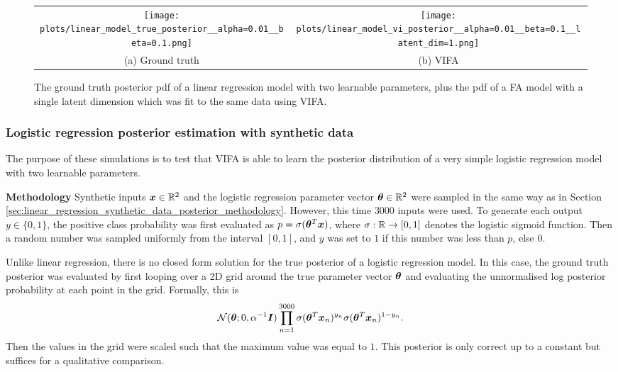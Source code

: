 \documentclass[10pt]{article} %
\begin{document}
\begin{figure}[!htbp] 
\begin{center}
\begin{tabular}{cc}
	\texttt{[image: plots/linear\_model\_true\_posterior\_\_alpha=0.01\_\_beta=0.1.png]}
	& \texttt{[image: plots/linear\_model\_vi\_posterior\_\_alpha=0.01\_\_beta=0.1\_\_latent\_dim=1.png]} \\
	(a) Ground truth
	& (b) VIFA \\[6pt]
\end{tabular}
\end{center}
\caption{The ground truth posterior pdf of a linear regression model with two learnable parameters, plus the pdf of a FA model with a single latent dimension which was fit to the same data using VIFA.}
\label{fig:linear_regression_synthetic_data_posterior}
\end{figure}


\subsubsection{Logistic regression posterior estimation with synthetic data}

The purpose of these simulations is to test that VIFA is able to learn the posterior distribution of a very simple logistic regression model with two learnable parameters.

\textbf{Methodology} Synthetic inputs ${\bm{x}} \in \mathbb{R}^2$ and the logistic regression parameter vector ${\bm{\theta}} \in \mathbb{R}^2$ were sampled in the same way as in Section \ref{sec:linear_regression_synthetic_data_posterior_methodology}. However, this time $3000$ inputs were used. To generate each output $y \in \{0, 1\}$, the positive class probability was first evaluated as $p = \sigma({\bm{\theta}}^T {\bm{x}})$, where $\sigma: \mathbb{R} \rightarrow [0,1]$ denotes the logistic sigmoid function. Then a random number was sampled uniformly from the interval $[0, 1]$, and $y$ was set to $1$ if this number was less than $p$, else $0$.

Unlike linear regression, there is no closed form solution for the true posterior of a logistic regression model. In this case, the ground truth posterior was evaluated by first looping over a 2D grid around the true parameter vector ${\bm{\theta}}$ and evaluating the unnormalised log posterior probability at each point in the grid. Formally, this is
\begin{equation}
	\mathcal{N} ( {\bm{\theta}} ; 0, \alpha^{-1} {\bm{I}}) \prod_{n=1}^{3000} \sigma({\bm{\theta}}^T {\bm{x}}_n)^{y_n} \sigma({\bm{\theta}}^T {\bm{x}}_n)^{1 - y_n}.
\end{equation}
Then the values in the grid were scaled such that the maximum value was equal to $1$. This posterior is only correct up to a constant but suffices for a qualitative comparison.
\end{document}
